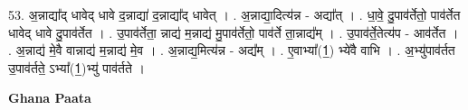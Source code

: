 \documentclass[17pt]{extarticle}
\begin{document}
53. अ॒न्नाद्या᳚द् धावेद् धावे द॒न्नाद्या॑ द॒न्नाद्या᳚द् धावेत् । . अ॒न्नाद्या॒दित्य॑न्न - अद्या᳚त् । . धा॒वे॒ दु॒पाव॑र्तेतो॒ पाव॑र्तेत धावेद् धावे दु॒पाव॑र्तेत । . उ॒पाव॑र्तेता॒ न्नाद्य॑ म॒न्नाद्य॑ मु॒पाव॑र्तेतो॒ पाव॑र्ते ता॒न्नाद्य᳚म् । . उ॒पाव॑र्ते॒तेत्य॑प - आव॑र्तेत । . अ॒न्नाद्य॑ मे॒वै वान्नाद्य॑ म॒न्नाद्य॑ मे॒व । . अ॒न्नाद्य॒मित्य॑न्न - अद्य᳚म् । . ए॒वाभ्या᳚(1॒) भ्ये॑वै वाभि । . अ॒भ्यु॑पाव॑र्तत उ॒पाव॑र्तते॒ ऽभ्या᳚(1॒)भ्यु॑ पाव॑र्तते । \newline

\textbf{Ghana Paata } \newline
\end{document}
